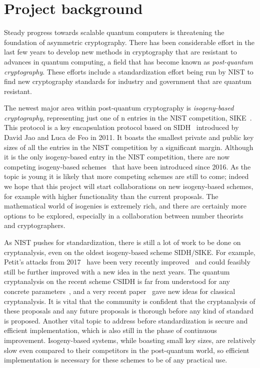 \documentclass{article}
\begin{document}
\section{Project background}

Steady progress towards scalable quantum computers is threatening the foundation of asymmetric cryptography. 
There has been considerable effort in the last few years to develop new methods in cryptography that are resistant to advances in quantum computing, a field that has become known as \emph{post-quantum cryptography}. 
These efforts include a standardization effort being run by NIST \cite{NIST-comp} to find new cryptography standards for industry and government that are quantum resistant.

The newest major area within post-quantum cryptography is \emph{isogeny-based cryptography}, representing just one of n entries in the NIST competition, SIKE~\cite{SIKE}. 
This protocol is a key encapsulation protocol based on SIDH~\cite{SIDH} introduced by David Jao and Luca de Feo in 2011.
It boasts the smallest private and public key sizes of all the entries in the NIST competition by a significant margin.
Although it is the only isogeny-based entry in the NIST competition,
there are now competing isogeny-based schemes~\cite{CSIDH, CSURF, CSIFiSh}
that have been introduced since 2016.
As the topic is young it is likely that more competing schemes are still to come;
indeed we hope that this project will start collaborations on new isogeny-based schemes, for example with higher functionality than the current proposals.
The mathematical world of isogenies is extremely rich,
and there are certainly more options to be explored, especially in a collaboration between number theorists and cryptographers.

As NIST pushes for standardization, there is still a lot of work to be done on cryptanalysis, even on the oldest isogeny-based scheme SIDH/SIKE. 
For example, Petit's attacks from 2017~\cite{Petit17} 
have been very recently improved~\cite{KMPPS20}
and could feasibly still be further improved with a new idea in the next years.
The quantum cryptanalysis on the recent scheme CSIDH is far from understood for any concrete parameters~\cite{simons-talk},
and a very recent paper~\cite{characters} gave new ideas for classical cryptanalysis.
It is vital that the community is confident that the cryptanalysis of these proposals
and any future proposals is thorough before any kind of standard is proposed.
Another vital topic to address before standardization is secure and efficient implementation, which is also still in the phase of continuous improvement. 
Isogeny-based systems, while boasting small key sizes,
are relatively slow even compared to their competitors in the post-quantum world,
so efficient implementation is necessary for these schemes to be of any practical use.
\end{document}
